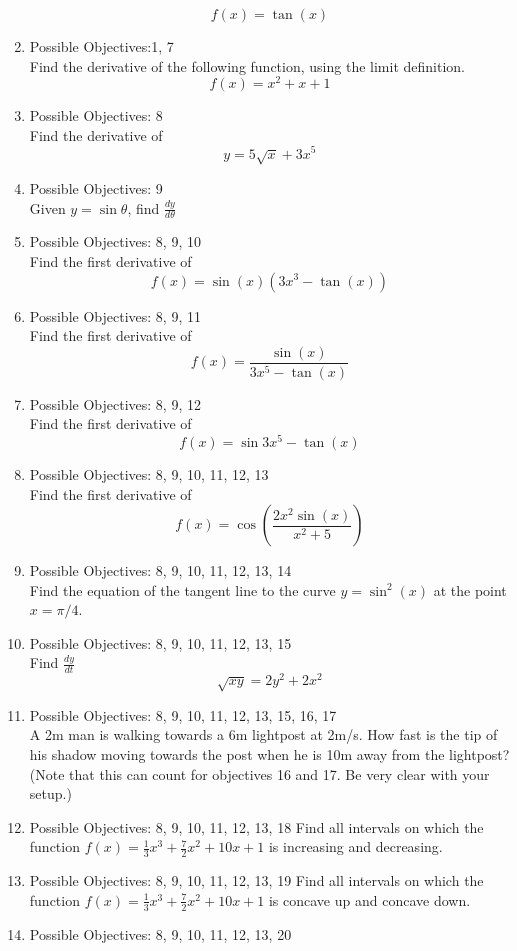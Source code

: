 \documentclass{exam}
\begin{document}
\begin{enumerate}
$$f(x) = \tan(x)$$
\item Possible Objectives:1, 7\\
Find the derivative of the following function, using the limit definition.
$$f(x) = x^2 + x + 1$$
\item Possible Objectives: 8\\
Find the derivative of $$y = 5\sqrt{x} + 3x^5$$ 
\item Possible Objectives: 9\\
Given $y = \sin{\theta}$, find $\frac{dy}{d\theta}$
\item Possible Objectives: 8, 9, 10\\
Find the first derivative of $$f(x) = \sin(x)(3x^3 - \tan(x))$$
\item Possible Objectives: 8, 9, 11\\
Find the first derivative of $$f(x) = \frac{\sin(x)}{3x^5 - \tan(x)}$$
\item Possible Objectives: 8, 9, 12\\ 
Find the first derivative of $$f(x) = \sin{3x^5 - \tan(x)}$$
\item Possible Objectives: 8, 9, 10, 11, 12, 13\\
Find the first derivative of $$f(x) = \cos\left(\frac{2x^2\sin(x)}{x^2 +5}\right)$$
\item Possible Objectives: 8, 9, 10, 11, 12, 13, 14\\
Find the equation of the tangent line to the curve $y = \sin^2(x)$ at the point $x = \pi/4$.
\item Possible Objectives: 8, 9, 10, 11, 12, 13, 15\\
Find $\frac{dy}{dt}$
$$\sqrt{xy} = 2y^2 + 2x^2$$
\item Possible Objectives: 8, 9, 10, 11, 12, 13, 15, 16, 17\\
A 2m man is walking towards a 6m lightpost at 2m/s. How fast is the tip of his shadow moving towards the post when he is 10m away from the lightpost? (Note that this can count for objectives 16 and 17. Be very clear with your setup.)
\item Possible Objectives: 8, 9, 10, 11, 12, 13, 18
Find all intervals on which the function $f(x) = \frac{1}{3}x^3 + \frac{7}{2}x^2 + 10x + 1$ is increasing and decreasing.
\item Possible Objectives: 8, 9, 10, 11, 12, 13, 19
Find all intervals on which the function $f(x) = \frac{1}{3}x^3 + \frac{7}{2}x^2 + 10x + 1$ is concave up and concave down.
\item Possible Objectives: 8, 9, 10, 11, 12, 13, 20

\end{enumerate}
\end{document}
